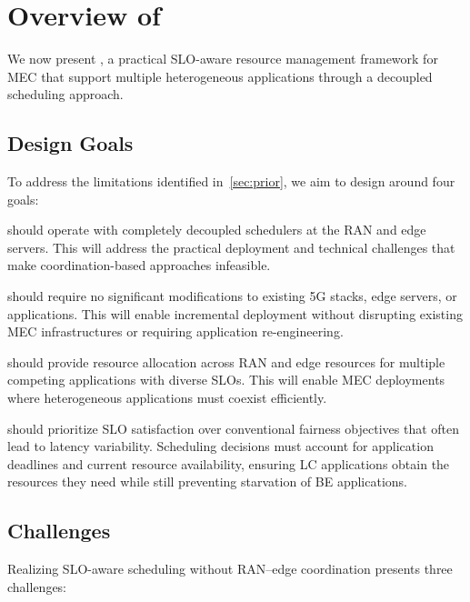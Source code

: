 \section{Overview of \sys}
\label{sec:overview}

We now present \sys{}, a practical SLO-aware resource management framework for MEC that support multiple heterogeneous applications through a decoupled scheduling approach.

\subsection{Design Goals}
\label{sec:design-goals}

To address the limitations identified in~\autoref{sec:prior}, we aim to design \sys{} around four goals:

\sys{} should operate with completely decoupled schedulers at the RAN and edge servers. %
This will address the practical deployment and technical challenges that make coordination-based approaches infeasible.

\sys{} should require no significant modifications to existing 5G stacks, edge servers, or applications.
This will enable incremental deployment without disrupting existing MEC infrastructures or requiring application re-engineering.

\sys{} should provide resource allocation across RAN and edge resources for multiple competing applications with diverse SLOs.
This will enable MEC deployments where heterogeneous applications must coexist efficiently.

\sys{} should prioritize SLO satisfaction over conventional fairness objectives that often lead to latency variability. 
Scheduling decisions must account for application deadlines and current resource availability, ensuring LC applications obtain the resources they need while still preventing starvation of BE  applications.


\subsection{Challenges}
\label{sec:challenges}

Realizing SLO-aware scheduling without RAN--edge coordination presents three challenges:

